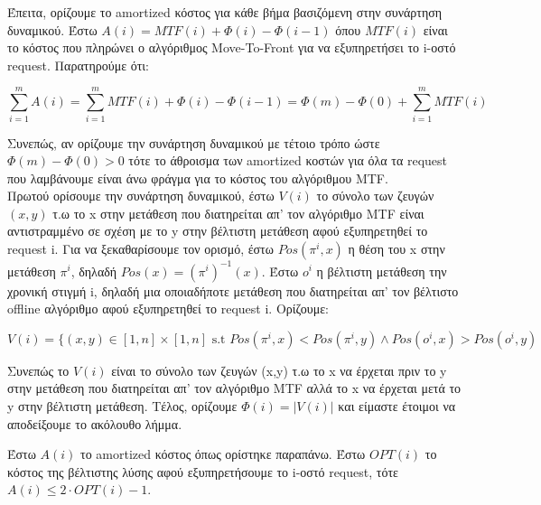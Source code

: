 Έπειτα, ορίζουμε το amortized κόστος για κάθε βήμα βασιζόμενη στην συνάρτηση δυναμικού. Έστω $A(i) = MTF(i) + \Phi(i) - \Phi(i-1)$ όπου $MTF(i)$ είναι το κόστος που πληρώνει ο αλγόριθμος  Move-To-Front για να εξυπηρετήσει το i-οστό request. Παρατηρούμε ότι:

\begin{equation}\label{e:amortized_cost}
    \sum_{i=1}^m A(i) = \sum_{i=1}^m MTF(i) + \Phi(i) - \Phi(i-1) = \Phi(m) - \Phi(0) + \sum_{i=1}^m MTF(i)
\end{equation}

Συνεπώς, αν ορίζουμε την συνάρτηση δυναμικού με τέτοιο τρόπο ώστε $\Phi(m) - \Phi(0) > 0$ τότε το άθροισμα των amortized κοστών για όλα τα request που λαμβάνουμε είναι άνω φράγμα για το κόστος του αλγόριθμου MTF. \\

Πρωτού ορίσουμε την συνάρτηση δυναμικού, έστω $V(i)$ το σύνολο των ζευγών $(x,y)$ τ.ω το x στην μετάθεση που διατηρείται απ' τον αλγόριθμο MTF είναι αντιστραμμένο σε σχέση με το y  στην βέλτιστη μετάθεση αφού εξυπηρετηθεί το request i. Για να ξεκαθαρίσουμε τον ορισμό, έστω $Pos( \pi^i, x)$ η θέση του x στην μετάθεση $\pi^i$, δηλαδή $Pos(x) = (\pi^i)^{-1}(x)$. Έστω $o^i$ η βέλτιστη μετάθεση την χρονική στιγμή i, δηλαδή μια οποιαδήποτε μετάθεση που διατηρείται απ' τον βέλτιστο offline αλγόριθμο αφού εξυπηρετηθεί το request i. Ορίζουμε:

\begin{equation*}
    V(i) = \{ ( x,y ) \in [1, n] \times [1,n] \text{ s.t } Pos( \pi^i, x ) < Pos( \pi^i, y ) \land Pos( o^i, x ) > Pos( o^i, y )
\end{equation*}

Συνεπώς το $V(i)$ είναι το σύνολο των ζευγών (x,y) τ.ω το x να έρχεται πριν το y  στην μετάθεση που διατηρείται απ' τον αλγόριθμο MTF  αλλά το x  να έρχεται μετά το y  στην βέλτιστη μετάθεση. Τέλος, ορίζουμε $\Phi(i) = |V(i)|$ και είμαστε έτοιμοι να αποδείξουμε το ακόλουθο λήμμα.

\begin{λήμμα}\label{c:amortized_bound}
    Έστω $A(i)$ το amortized κόστος όπως ορίστηκε παραπάνω. Έστω $OPT(i)$ το κόστος της βέλτιστης λύσης αφού εξυπηρετήσουμε το i-οστό request, τότε $A(i) \leq 2 \cdot OPT(i)-1$.
\end{λήμμα}

